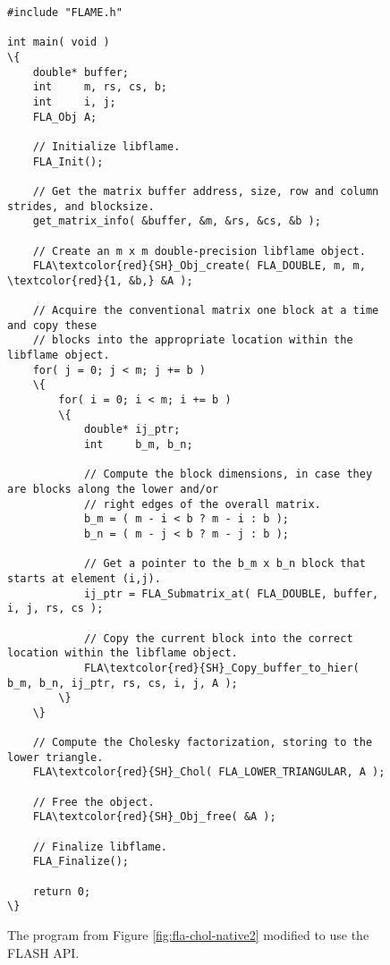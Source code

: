 \begin{figure}[t]
\begin{Verbatim}[frame=single,framesep=2.5mm,xleftmargin=5mm,commandchars=\\\{\},fontsize=\footnotesize]
#include "FLAME.h"

int main( void )
\{
    double* buffer;
    int     m, rs, cs, b;
    int     i, j;
    FLA_Obj A;

    // Initialize libflame.
    FLA_Init();

    // Get the matrix buffer address, size, row and column strides, and blocksize.
    get_matrix_info( &buffer, &m, &rs, &cs, &b );

    // Create an m x m double-precision libflame object.
    FLA\textcolor{red}{SH}_Obj_create( FLA_DOUBLE, m, m, \textcolor{red}{1, &b,} &A );

    // Acquire the conventional matrix one block at a time and copy these
    // blocks into the appropriate location within the libflame object.
    for( j = 0; j < m; j += b )
    \{
        for( i = 0; i < m; i += b )
        \{
            double* ij_ptr;
            int     b_m, b_n;

            // Compute the block dimensions, in case they are blocks along the lower and/or
            // right edges of the overall matrix.
            b_m = ( m - i < b ? m - i : b );
            b_n = ( m - j < b ? m - j : b );

            // Get a pointer to the b_m x b_n block that starts at element (i,j).
            ij_ptr = FLA_Submatrix_at( FLA_DOUBLE, buffer, i, j, rs, cs );

            // Copy the current block into the correct location within the libflame object.
            FLA\textcolor{red}{SH}_Copy_buffer_to_hier( b_m, b_n, ij_ptr, rs, cs, i, j, A );
        \}
    \}

    // Compute the Cholesky factorization, storing to the lower triangle.
    FLA\textcolor{red}{SH}_Chol( FLA_LOWER_TRIANGULAR, A );

    // Free the object.
    FLA\textcolor{red}{SH}_Obj_free( &A );

    // Finalize libflame.
    FLA_Finalize();

    return 0;
\}
\end{Verbatim}
\caption{
The program from Figure \ref{fig:fla-chol-native2} modified to use
the FLASH API.
}
\label{fig:flash-chol-native2}
\end{figure}

